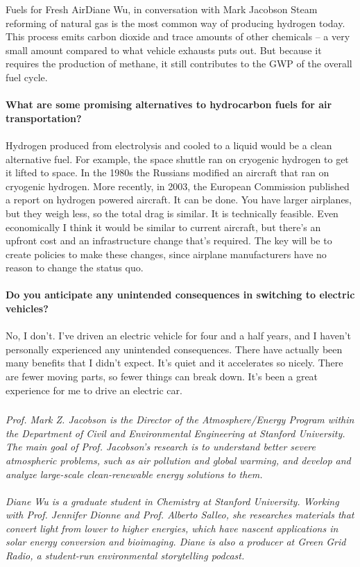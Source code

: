 \documentclass{papertex}
\begin{document}
\begin{news}{2}{Fuels for Fresh Air}{Diane Wu, in conversation with Mark Jacobson}{}{}
Steam reforming of natural gas is the most common way of producing hydrogen 
today. This process emits carbon dioxide and trace amounts of other 
chemicals – a very small amount compared to what vehicle exhausts puts out. 
But because it requires the production of methane, it still contributes to 
the GWP of the overall fuel cycle.
\\
\\
\textbf{What are some promising alternatives to hydrocarbon fuels for air 
    transportation?}
\\
\\
Hydrogen produced from electrolysis and cooled to a liquid would be a clean 
alternative fuel. For example, the space shuttle ran on cryogenic hydrogen to 
get it lifted to space. In the 1980s the Russians modified an aircraft that 
ran on cryogenic hydrogen. More recently, in 2003, the European Commission 
published a report on hydrogen powered aircraft. It can be done. You have 
larger airplanes, but they weigh less, so the total drag is similar. It is 
technically feasible. Even economically I think it would be similar to current 
aircraft, but there’s an upfront cost and an infrastructure change that’s 
required. The key will be to create policies to make these changes, since 
airplane manufacturers have no reason to change the status quo.
\\
\\
\textbf{Do you anticipate any unintended consequences in switching to electric 
    vehicles?}
\\
\\
No, I don’t. I’ve driven an electric vehicle for four and a half years, and I 
haven’t personally experienced any unintended consequences. There have 
actually been many benefits that I didn’t expect. It’s quiet and it 
accelerates so nicely. There are fewer moving parts, so fewer things can 
break down. It’s been a great experience for me to drive an electric car.

\subsubsection*{}

\emph{Prof. Mark Z. Jacobson is the Director of the Atmosphere/Energy Program 
within the Department of Civil and Environmental Engineering at Stanford 
University. The main goal of Prof. Jacobson’s research is to understand 
better severe atmospheric problems, such as air pollution and global warming, 
and develop and analyze large-scale clean-renewable energy solutions to them.}
\\
\\
\emph{Diane Wu is a graduate student in Chemistry at Stanford University. 
Working with Prof. Jennifer Dionne and Prof. Alberto Salleo, she researches 
materials that convert light from lower to higher energies, which have nascent 
applications in solar energy conversion and bioimaging. Diane is also a 
producer at Green Grid Radio, a student-run environmental storytelling 
podcast.}

\end{news}
\end{document}
